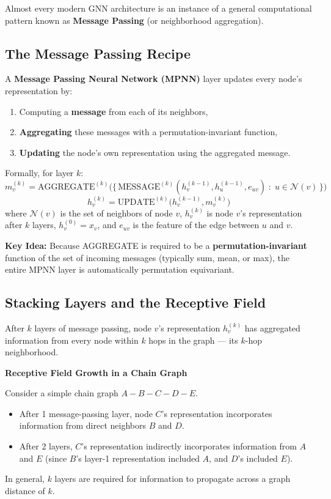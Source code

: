 \documentclass[12pt,a4paper]{article}
\begin{document}
Almost every modern GNN architecture is an instance of a general computational pattern known as \textbf{Message Passing} (or neighborhood aggregation).

\subsection{The Message Passing Recipe}

\begin{definition}
A \textbf{Message Passing Neural Network (MPNN)} layer updates every node's representation by:
\begin{enumerate}
    \item Computing a \textbf{message} from each of its neighbors,
    \item \textbf{Aggregating} these messages with a permutation-invariant function,
    \item \textbf{Updating} the node's own representation using the aggregated message.
\end{enumerate}
Formally, for layer $k$:
\[
m_v^{(k)} = \text{AGGREGATE}^{(k)}\Big(\big\{\, \text{MESSAGE}^{(k)}(h_v^{(k-1)}, h_u^{(k-1)}, e_{uv}) \;:\; u \in \mathcal{N}(v) \,\big\}\Big)
\]
\[
h_v^{(k)} = \text{UPDATE}^{(k)}\big(h_v^{(k-1)}, m_v^{(k)}\big)
\]
where $\mathcal{N}(v)$ is the set of neighbors of node $v$, $h_v^{(k)}$ is node $v$'s representation after $k$ layers, $h_v^{(0)} = x_v$, and $e_{uv}$ is the feature of the edge between $u$ and $v$.
\end{definition}

\textbf{Key Idea:} Because AGGREGATE is required to be a \textbf{permutation-invariant} function of the set of incoming messages (typically sum, mean, or max), the entire MPNN layer is automatically permutation equivariant.

\subsection{Stacking Layers and the Receptive Field}

After $k$ layers of message passing, node $v$'s representation $h_v^{(k)}$ has aggregated information from every node within $k$ hops in the graph --- its $k$-hop neighborhood.

\begin{example}
\textbf{Receptive Field Growth in a Chain Graph}

Consider a simple chain graph $A - B - C - D - E$.
\begin{itemize}
    \item After 1 message-passing layer, node $C$'s representation incorporates information from direct neighbors $B$ and $D$.
    \item After 2 layers, $C$'s representation indirectly incorporates information from $A$ and $E$ (since $B$'s layer-1 representation included $A$, and $D$'s included $E$).
\end{itemize}
In general, $k$ layers are required for information to propagate across a graph distance of $k$.
\end{example}
\end{document}

